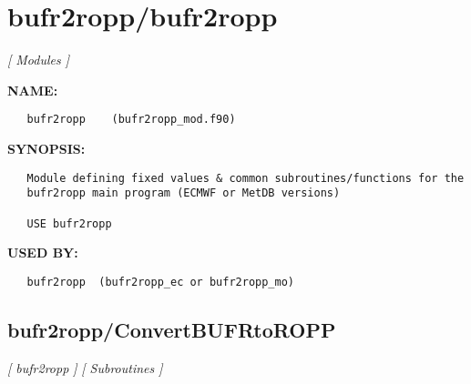 \section{bufr2ropp/bufr2ropp}
\textsl{[ Modules ]}

\label{ch:robo14}
\label{ch:bufr2ropp_bufr2ropp}
\textbf{NAME:}\hspace{0.08in}\begin{Verbatim}
   bufr2ropp    (bufr2ropp_mod.f90)
\end{Verbatim}
\textbf{SYNOPSIS:}\hspace{0.08in}\begin{Verbatim}
   Module defining fixed values & common subroutines/functions for the
   bufr2ropp main program (ECMWF or MetDB versions)

   USE bufr2ropp
\end{Verbatim}
\textbf{USED BY:}\hspace{0.08in}\begin{Verbatim}
   bufr2ropp  (bufr2ropp_ec or bufr2ropp_mo)
\end{Verbatim}
\subsection{bufr2ropp/ConvertBUFRtoROPP}
\textsl{[ bufr2ropp ]}
\textsl{[ Subroutines ]}

